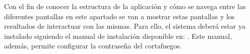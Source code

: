 Con el fin de conocer la estructura de la aplicación y cómo se navega entre las diferentes pantallas en este apartado se van a mostrar estas pantallas y los resultados de interactuar con las mismas. Para ello, el sistema deberá estar ya instalado siguiendo el manual de instalación disponible en:  . Este manual, además, permite configurar la contraseña del cortafuegos.